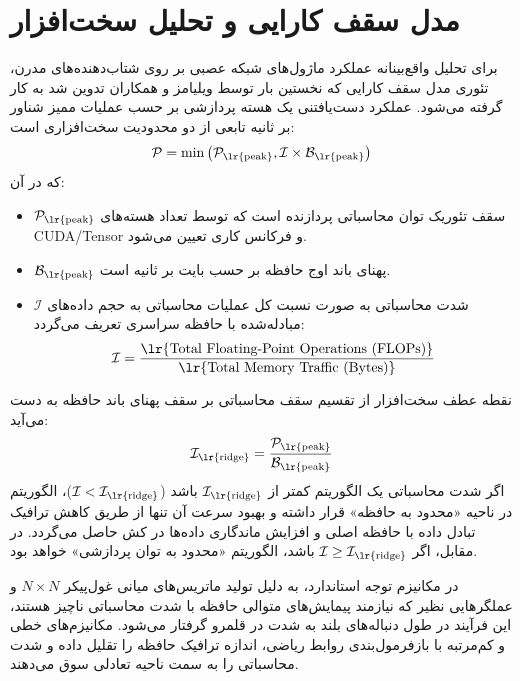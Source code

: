 \documentclass[12pt,a4paper]{report}
\theoremstyle{definition}
\begin{document}
\section{مدل سقف کارایی  و تحلیل سخت‌افزار}
برای تحلیل واقع‌بینانه عملکرد ماژول‌های شبکه عصبی بر روی شتاب‌دهنده‌های مدرن، تئوری مدل سقف کارایی  که نخستین بار توسط ویلیامز و همکاران تدوین شد به کار گرفته می‌شود. عملکرد دست‌یافتنی یک هسته پردازشی بر حسب عملیات ممیز شناور بر ثانیه  تابعی از دو محدودیت سخت‌افزاری است:
\begin{equation}
\mathcal{P} = \min \left( \mathcal{P}_{\text{\lr{peak}}}, \mathcal{I} \times \mathcal{B}_{\text{\lr{peak}}} \right)
\end{equation}
که در آن:
\begin{itemize}
    \item $\mathcal{P}_{\text{\lr{peak}}}$ سقف تئوریک توان محاسباتی پردازنده  است که توسط تعداد هسته‌های CUDA/Tensor و فرکانس کاری تعیین می‌شود.
    \item $\mathcal{B}_{\text{\lr{peak}}}$ پهنای باند اوج حافظه  بر حسب بایت بر ثانیه است.
    \item $\mathcal{I}$ شدت محاسباتی  به صورت نسبت کل عملیات محاسباتی به حجم داده‌های مبادله‌شده با حافظه سراسری تعریف می‌گردد:
    \begin{equation}
    \mathcal{I} = \frac{\text{\lr{Total Floating-Point Operations (FLOPs)}}}{\text{\lr{Total Memory Traffic (Bytes)}}}
    \end{equation}
\end{itemize}

نقطه عطف سخت‌افزار  از تقسیم سقف محاسباتی بر سقف پهنای باند حافظه به دست می‌آید:
\begin{equation}
\mathcal{I}_{\text{\lr{ridge}}} = \frac{\mathcal{P}_{\text{\lr{peak}}}}{\mathcal{B}_{\text{\lr{peak}}}}
\end{equation}
اگر شدت محاسباتی یک الگوریتم کمتر از $\mathcal{I}_{\text{\lr{ridge}}}$ باشد ($\mathcal{I} < \mathcal{I}_{\text{\lr{ridge}}}$)، الگوریتم در ناحیه «محدود به حافظه»  قرار داشته و بهبود سرعت آن تنها از طریق کاهش ترافیک تبادل داده با حافظه اصلی و افزایش ماندگاری داده‌ها در کش  حاصل می‌گردد. در مقابل، اگر $\mathcal{I} \ge \mathcal{I}_{\text{\lr{ridge}}}$ باشد، الگوریتم «محدود به توان پردازشی»  خواهد بود.

در مکانیزم توجه استاندارد، به دلیل تولید ماتریس‌های میانی غول‌پیکر $N \times N$ و عملگرهایی نظیر  که نیازمند پیمایش‌های متوالی حافظه با شدت محاسباتی ناچیز هستند، این فرآیند در طول دنباله‌های بلند به شدت در قلمرو  گرفتار می‌شود. مکانیزم‌های خطی و کم‌مرتبه با بازفرمول‌بندی روابط ریاضی، اندازه ترافیک حافظه را تقلیل داده و شدت محاسباتی را به سمت ناحیه تعادلی سوق می‌دهند.
\end{document}
